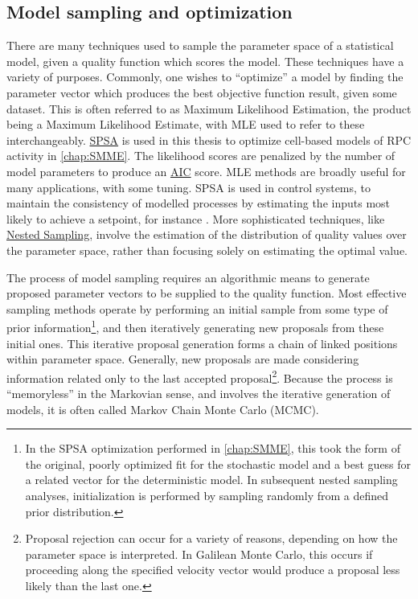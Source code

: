\subsection{Model sampling and optimization}
\label{ssec:MLE}
There are many techniques used to sample the parameter space of a statistical model, given a quality function which scores the model. These techniques have a variety of purposes. Commonly, one wishes to ``optimize'' a model by finding the parameter vector which produces the best objective function result, given some dataset. This is often referred to as Maximum Likelihood Estimation, the product being a Maximum Likelihood Estimate, with MLE used to refer to these interchangeably. \hyperref[ssec:SPSA]{SPSA} is used in this thesis to optimize cell-based models of RPC activity in \autoref{chap:SMME}. The likelihood scores are penalized by the number of model parameters to produce an \hyperref[ssec:AIC]{AIC} score. MLE methods are broadly useful for many applications, with some tuning. SPSA is used in control systems, to maintain the consistency of modelled processes by estimating the inputs most likely to achieve a setpoint, for instance \cite{Zhou2008}. More sophisticated techniques, like \hyperref[ssec:nested]{Nested Sampling}, involve the estimation of the distribution of quality values over the parameter space, rather than focusing solely on estimating the optimal value.

The process of model sampling requires an algorithmic means to generate proposed parameter vectors to be supplied to the quality function. Most effective sampling methods operate by performing an initial sample from some type of prior information\footnote{In the SPSA optimization performed in \autoref{chap:SMME}, this took the form of the original, poorly optimized fit for the stochastic model and a best guess for a related vector for the deterministic model. In subsequent nested sampling analyses, initialization is performed by sampling randomly from a defined prior distribution.}, and then iteratively generating new proposals from these initial ones. This iterative proposal generation forms a chain of linked positions within parameter space. Generally, new proposals are made considering information related only to the last accepted proposal\footnote{Proposal rejection can occur for a variety of reasons, depending on how the parameter space is interpreted. In Galilean Monte Carlo, this occurs if proceeding along the specified velocity vector would produce a proposal less likely than the last one.}. Because the process is ``memoryless'' in the Markovian sense, and involves the iterative generation of models, it is often called Markov Chain Monte Carlo (MCMC).

